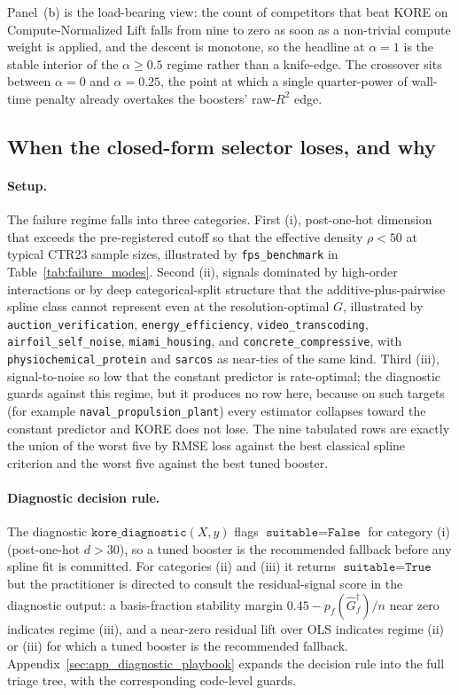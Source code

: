 \documentclass{article}
\newcommand{\KORE}{\textsc{KORE}}
\begin{document}
Panel~(b) is the load-bearing view: the count of competitors that beat \KORE{} on Compute-Normalized Lift falls from nine to zero as soon as a non-trivial compute weight is applied, and the descent is monotone, so the headline at $\alpha = 1$ is the stable interior of the $\alpha \ge 0.5$ regime rather than a knife-edge. The crossover sits between $\alpha = 0$ and $\alpha = 0.25$, the point at which a single quarter-power of wall-time penalty already overtakes the boosters' raw-$R^2$ edge.

\FloatBarrier
\subsection{When the closed-form selector loses, and why}
\label{sec:failure_modes}

\paragraph{Setup.}
The failure regime falls into three categories. First (i), post-one-hot dimension that exceeds the pre-registered cutoff so that the effective density $\rho < 50$ at typical CTR23 sample sizes, illustrated by \texttt{fps\_benchmark} in Table~\ref{tab:failure_modes}. Second (ii), signals dominated by high-order interactions or by deep categorical-split structure that the additive-plus-pairwise spline class cannot represent even at the resolution-optimal $G$, illustrated by \texttt{auction\_verification}, \texttt{energy\_efficiency}, \texttt{video\_transcoding}, \texttt{airfoil\_self\_noise}, \texttt{miami\_housing}, and \texttt{concrete\_compressive}, with \texttt{physiochemical\_protein} and \texttt{sarcos} as near-ties of the same kind. Third (iii), signal-to-noise so low that the constant predictor is rate-optimal; the diagnostic guards against this regime, but it produces no row here, because on such targets (for example \texttt{naval\_propulsion\_plant}) every estimator collapses toward the constant predictor and \KORE{} does not lose. The nine tabulated rows are exactly the union of the worst five by RMSE loss against the best classical spline criterion and the worst five against the best tuned booster.

\paragraph{Diagnostic decision rule.}
The diagnostic $\texttt{kore\_diagnostic}(X, y)$ flags $\texttt{suitable} = \texttt{False}$ for category (i) (post-one-hot $d > 30$), so a tuned booster is the recommended fallback before any spline fit is committed. For categories (ii) and (iii) it returns $\texttt{suitable} = \texttt{True}$ but the practitioner is directed to consult the residual-signal score in the diagnostic output: a basis-fraction stability margin $0.45 - p_f(\widehat G_f^\dagger)/n$ near zero indicates regime (iii), and a near-zero residual lift over OLS indicates regime (ii) or (iii) for which a tuned booster is the recommended fallback. Appendix~\ref{sec:app_diagnostic_playbook} expands the decision rule into the full triage tree, with the corresponding code-level guards.
\end{document}
